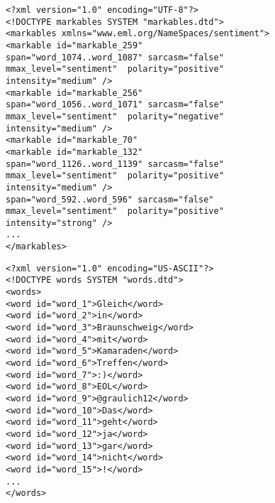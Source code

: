 \begin{minipage}[t]{\textwidth}
  \begin{minipage}[t]{0.45\textwidth}
    \begin{lstlisting}[basicstyle=\tiny]
<?xml version="1.0" encoding="UTF-8"?>
<!DOCTYPE markables SYSTEM "markables.dtd">
<markables xmlns="www.eml.org/NameSpaces/sentiment">
<markable id="markable_259"
span="word_1074..word_1087" sarcasm="false"
mmax_level="sentiment"  polarity="positive"
intensity="medium" />
<markable id="markable_256"
span="word_1056..word_1071" sarcasm="false"
mmax_level="sentiment"  polarity="negative"
intensity="medium" />
<markable id="markable_70"
<markable id="markable_132"
span="word_1126..word_1139" sarcasm="false"
mmax_level="sentiment"  polarity="positive"
intensity="medium" />
span="word_592..word_596" sarcasm="false"
mmax_level="sentiment"  polarity="positive"
intensity="strong" />
...
</markables>
    \end{lstlisting}%
  \end{minipage}\hfill%
  \begin{minipage}[t]{0.45\textwidth}%
    \begin{lstlisting}[basicstyle=\tiny]
<?xml version="1.0" encoding="US-ASCII"?>
<!DOCTYPE words SYSTEM "words.dtd">
<words>
<word id="word_1">Gleich</word>
<word id="word_2">in</word>
<word id="word_3">Braunschweig</word>
<word id="word_4">mit</word>
<word id="word_5">Kamaraden</word>
<word id="word_6">Treffen</word>
<word id="word_7">:)</word>
<word id="word_8">EOL</word>
<word id="word_9">@graulich12</word>
<word id="word_10">Das</word>
<word id="word_11">geht</word>
<word id="word_12">ja</word>
<word id="word_13">gar</word>
<word id="word_14">nicht</word>
<word id="word_15">!</word>
...
</words>
    \end{lstlisting}%
  \end{minipage}
\end{minipage}

